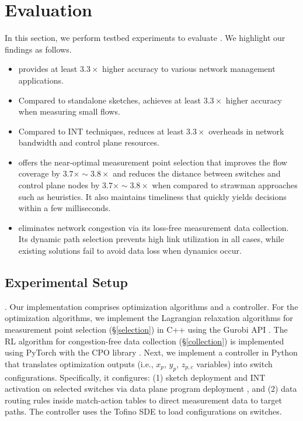\section{Evaluation}

In this section, we perform testbed experiments to evaluate \sysname. We highlight our findings as follows.

\begin{itemize}[leftmargin=*]
%
    \item \sysname provides at least $3.3\times$ higher accuracy to various network management applications. 
%
    \item Compared to standalone sketches, \sysname achieves at least $3.3\times$ higher accuracy when measuring small flows.
%
    \item Compared to INT techniques, \sysname reduces at least $3.3\times$ overheads in network bandwidth and control plane resources. 
%
    \item \sysname offers the near-optimal measurement point selection that improves the flow coverage by $3.7\times \sim 3.8\times$ and reduces the distance between switches and control plane nodes by $3.7\times \sim 3.8\times$ when compared to strawman approaches such as heuristics. It also maintains timeliness that quickly yields decisions within a few milliseconds. 
%
    \item \sysname eliminates network congestion via its loss-free measurement data collection. Its dynamic path selection prevents high link utilization in all cases, while existing solutions fail to avoid data loss when dynamics occur. 
%
\end{itemize}

\subsection{Experimental Setup}\label{setup}

. Our implementation comprises optimization algorithms and a controller. For the optimization algorithms, we implement the Lagrangian relaxation algorithms for measurement point selection (\S\ref{selection}) in C++ using the Gurobi API \cite{gurobi}. The RL algorithm for congestion-free data collection (\S\ref{collection}) is implemented using PyTorch with the CPO library \cite{pytorch}. Next, we implement a controller in Python that translates optimization outputs (i.e., \(x_p\), \(y_p\), \(z_{p,c}\) variables) into switch configurations. Specifically, it configures: (1) sketch deployment and INT activation on selected switches via data plane program deployment \cite{chen2020speed,gao2020lyra}, and (2) data routing rules inside match-action tables to direct measurement data to target paths. The controller uses the Tofino SDE \cite{tofino2} to load configurations on switches.

